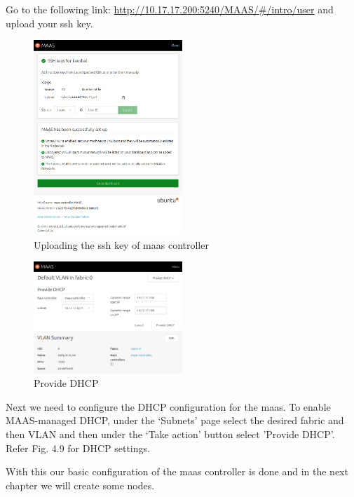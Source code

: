 Go to the following link: \url{http://10.17.17.200:5240/MAAS/#/intro/user} and upload your ssh key.

\begin{figure}[!ht]
    \centering
    \includegraphics[width=0.5\textwidth]{images/4-8.png}
    \caption{Uploading the ssh key of maas controller}
\end{figure}

\begin{figure}[!ht]
    \centering
    \includegraphics[width=0.5\textwidth]{images/4-9.png}
    \caption{Provide DHCP}
\end{figure}

Next we need to configure the DHCP configuration for the maas. To enable MAAS-managed DHCP, under the ‘Subnets’ page select the desired fabric and then VLAN and then under the ‘Take action’ button select 'Provide DHCP'. Refer Fig. 4.9 for DHCP settings.

With this our basic configuration of the maas controller is done and in the next chapter we will create some nodes.
